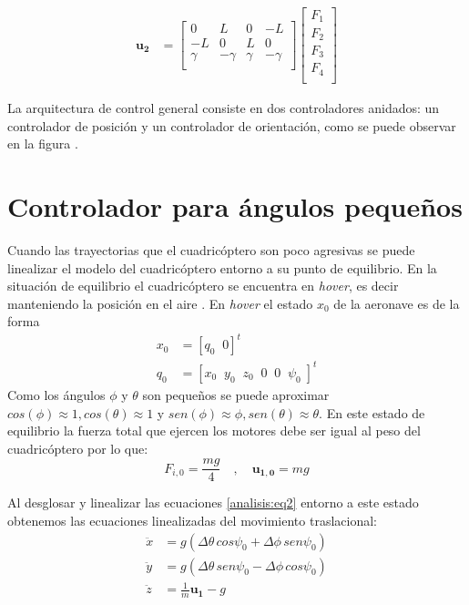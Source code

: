 \begin{align}
	\mathbf{u_2}  &= \begin{bmatrix}
		0&L&0&-L\\
		-L&0&L&0\\
		\gamma&-\gamma&\gamma&-\gamma\\
	\end{bmatrix}\begin{bmatrix} F_1\\ 
	F_2\\ 
	F_3\\ 
	F_4\\ 
\end{bmatrix}\label{eq:u2}
\end{align} 

La arquitectura de control general consiste en dos controladores anidados: un controlador de posición y un controlador de orientación, como se puede observar en la figura .




\section{Controlador para ángulos pequeños}
Cuando las trayectorias que el cuadricóptero son poco agresivas se puede linealizar el modelo del cuadricóptero entorno a su punto de equilibrio. En la situación de equilibrio el cuadricóptero se encuentra en \textit{hover}, es decir manteniendo la posición en el aire . En \textit{hover} el estado $x_0$ de la aeronave es de la forma 
\begin{align}
	x_0 &= [q_0 \;\; 0]^t\nonumber\\
	q_0 &= [x_0  \;\;y_0  \;\;z_0  \;\;0  \;\;0  \;\;\psi_0  \;]^t
\end{align}
Como los ángulos $\phi$ y $\theta$ son pequeños se puede aproximar $cos(\phi) \approx 1 , cos(\theta) \approx 1$ y $sen(\phi) \approx \phi , sen(\theta) \approx \theta$. En este estado de equilibrio la fuerza total que ejercen los motores debe ser igual al peso del cuadricóptero por lo que:
\begin{equation}
	F_{i,0}  = \frac{mg}{4}\quad,\quad \mathbf{u_{1,0}} = mg
\end{equation}

Al desglosar y linealizar las ecuaciones \ref{analisis:eq2} entorno a este estado obtenemos las ecuaciones linealizadas del movimiento traslacional:
\begin{align}
	\ddot{x} &= g (\Delta\theta\, cos \psi_0 + \Delta\phi\,sen\psi_0)\nonumber \\
	\ddot{y} &= g(\Delta\theta\, sen \psi_0  - \Delta\phi\,cos\psi_0) \label{eq:control1}\\
	\ddot{z} &= \frac{1}{m}\mathbf{u_1}-g\nonumber
\end{align}

